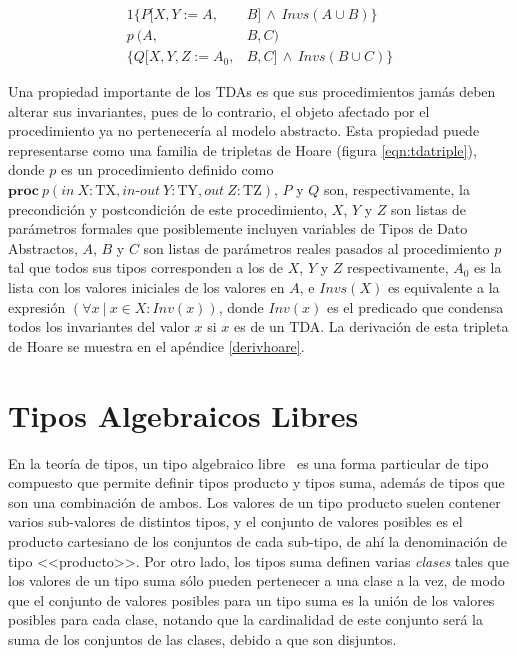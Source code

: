 \begin{alignat}{1}
  \{ P[X,Y:=A,&B]\, \land \, Invs(A \cup B)\} \nonumber \\
  p\  (A,&B,C) \label{eqn:tdatriple} \\ 
  \{ Q[X,Y,Z:=A_0,&B,C]\, \land \, Invs(B \cup C)\} \nonumber
\end{alignat}

Una propiedad importante de los TDAs es que sus procedimientos jamás deben
alterar sus invariantes, pues de lo contrario, el objeto afectado por el
procedimiento ya no pertenecería al modelo abstracto. Esta propiedad puede
representarse como una familia de tripletas de Hoare (figura
\ref{eqn:tdatriple}), donde $p$ es un procedimiento definido como
$\textbf{proc}\ p (in\ X : \textrm{TX}, in\textrm{-}out\ Y : \textrm{TY}, out\ Z : \textrm{TZ})$, $P$ y $Q$ son, respectivamente, la precondición y postcondición de este procedimiento, $X$, $Y$ y $Z$ son listas de parámetros formales que posiblemente incluyen
variables de Tipos de Dato Abstractos, $A$, $B$ y $C$ son listas de parámetros reales pasados al procedimiento $p$ tal que todos sus tipos corresponden a los de $X$, $Y$ y $Z$ respectivamente, $A_0$ es la lista con los valores iniciales de los valores
en $A$, e $Invs(X)$ es equivalente a la expresión $(\forall x\ |\ x \in X : Inv(x) )$, donde $Inv(x)$ es el predicado que condensa todos los
invariantes del valor $x$ si $x$ es de un TDA. La derivación de esta tripleta de Hoare se muestra en el apéndice \ref{derivhoare}.

\section{Tipos Algebraicos Libres}

En la teoría de tipos, un tipo algebraico libre~\cite{ravelotal, foldoc,
lazywithclass} es una forma particular de tipo compuesto que permite definir
tipos producto y tipos suma, además de tipos que son una combinación de ambos.
Los valores de un tipo producto suelen contener varios sub-valores de distintos
tipos, y el conjunto de valores posibles es el producto cartesiano de los
conjuntos de cada sub-tipo, de ahí la denominación de tipo <<producto>>. Por
otro lado, los tipos suma definen varias \textit{clases} tales que  los valores
de un tipo suma sólo pueden pertenecer a una clase a la vez, de modo que el
conjunto de valores posibles para un tipo suma es la unión de los valores
posibles para cada clase, notando que la cardinalidad de este conjunto será la
suma de los conjuntos de las clases, debido a que son disjuntos.

